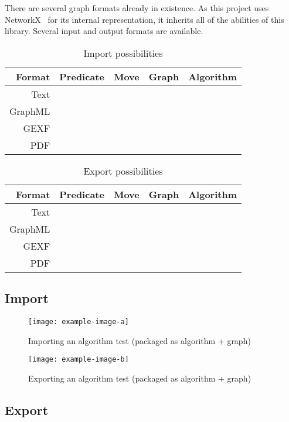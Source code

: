 There are several graph formats already in existence.
As this project uses NetworkX~\autocite{hagberg:networkx} for its internal representation,
  it inherits all of the abilities of this library.
Several input and output formats are available.
\begin{table}
  \centering
  \providecommand\yes{\ding{51}}
  \providecommand\no{\ding{55}}
  \begin{tabular}{rcccc}
    \toprule
    Format  & Predicate & Move & Graph & Algorithm \\
    \midrule
    Text    & \yes      & \yes & \yes  & \yes      \\
    GraphML & \no       & \no  & \yes  & \no       \\
    GEXF    & \no       & \no  & \yes  & \no       \\
    PDF     & \yes      & \yes & \yes  & \yes      \\
    \bottomrule
  \end{tabular}
  \caption{Import possibilities}
  \label{tab:interop:import}
\end{table}
\begin{table}
  \centering
  \providecommand\yes{\ding{51}}
  \providecommand\no{\ding{55}}
  \begin{tabular}{rcccc}
    \toprule
    Format  & Predicate & Move & Graph & Algorithm \\
    \midrule
    Text    & \yes      & \yes & \yes  & \yes      \\
    GraphML & \no       & \no  & \yes  & \no       \\
    GEXF    & \no       & \no  & \yes  & \no       \\
    PDF     & \yes      & \yes & \yes  & \yes      \\
    \bottomrule
  \end{tabular}
  \caption{Export possibilities}
  \label{tab:interop:export}
\end{table}


\subsection{Import}
\label{sec:interop:import}

\begin{figure}
  \centering
  \texttt{[image: example-image-a]}
  \caption{Importing an algorithm test (packaged as algorithm + graph)}
  \label{fig:iface:alg-test-import}
\end{figure}
\begin{figure}
  \centering
  \texttt{[image: example-image-b]}
  \caption{Exporting an algorithm test (packaged as algorithm + graph)}
  \label{fig:iface:alg-test-export}
\end{figure}

\subsection{Export}
\label{sec:interop:export}



